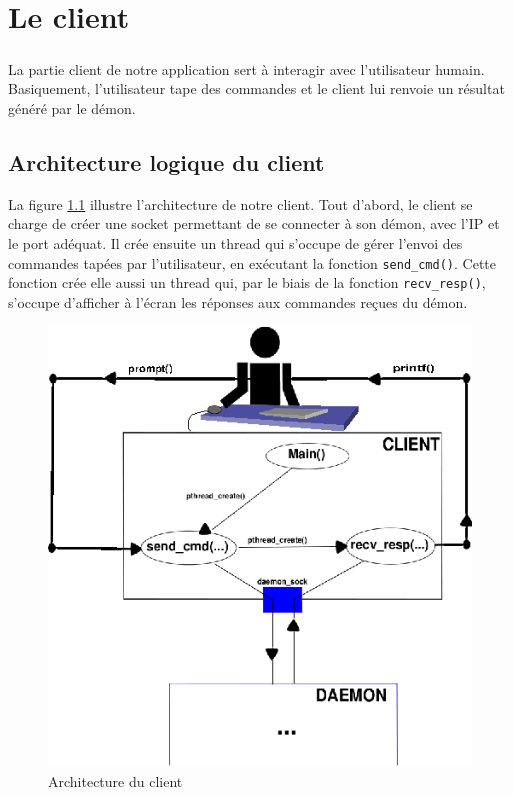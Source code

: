 
\chapter{Le client}

	\paragraph{}La partie client de notre application sert à interagir avec 
l'utilisateur humain. Basiquement, l'utilisateur tape des commandes et le 
client lui renvoie un résultat généré par le démon.
	
	\section{Architecture logique du client}

La figure \ref{client} illustre l'architecture de notre client. Tout d'abord, 
le client se charge de créer une socket permettant de se connecter à son démon,
 avec l'IP et le port adéquat. Il crée ensuite un thread qui s'occupe de gérer
 l'envoi des commandes tapées par l'utilisateur, en exécutant la fonction 
\verb"send_cmd()". Cette fonction crée elle aussi un thread qui, par le biais 
de la fonction \verb"recv_resp()", s'occupe d'afficher à l'écran les réponses 
aux commandes reçues du démon.
\begin{center}
\begin{figure}[h]
    \centering
    \includegraphics[scale=1.4]{client/archi_client.eps}
    \caption{Architecture du client}
    \label{client}
\end{figure}
\end{center}
